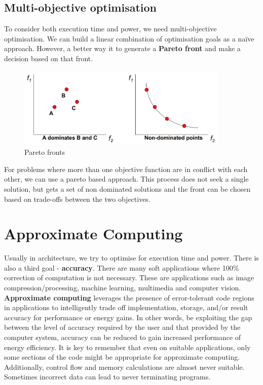 \documentclass[11pt]{article}
\begin{document}
\subsection{Multi-objective optimisation}
To consider both execution time and power, we need multi-objective optimisation. 
\n
We can build a linear combination of optimisation goals as a na\"{i}ve approach. However, a better way it to generate a \textbf{Pareto front} and make a decision based on that front. 
\begin{figure}[H]
\centering
\includegraphics[width=0.9\textwidth, keepaspectratio]{imgs/pareto-front.png}
\caption{Pareto fronts}
\end{figure}
\noindent
For problems where more than one objective function are in conflict with each other, we can use a pareto based approach. This process does not seek a single solution, but gets a set of non dominated solutions and the front can be chosen based on trade-offs between the two objectives.
\section{Approximate Computing}
Usually in architecture, we try to optimise for execution time and power. There is also a third goal - \textbf{accuracy}. There are many soft applications where 100\% correction of computation is not necessary. These are applications such as image compression/processing, machine learning, multimedia and computer vision. 
\n
\textbf{Approximate computing} leverages the presence of error-tolerant code regions in applications to intelligently trade off implementation, storage, and/or result accuracy for performance or energy gains. In other words, be exploiting the gap between the level of accuracy required by the user and that provided by the computer system, accuracy can be reduced to gain increased performance of energy efficiency. 
\n
It is key to remember that even on suitable applications, only some sections of the code might be appropriate for approximate computing. Additionally, control flow and memory calculations are almost never suitable. Sometimes incorrect data can lead to never terminating programs.
\end{document}
